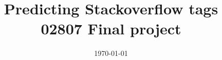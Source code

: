 \documentclass[a4paper]{article}
\numberwithin{equation}{section}
\begin{document}
\title{Predicting Stackoverflow tags \\ 02807 Final project}
\date{\today}

\maketitle









%

\pagebreak
\printbibliography
\end{document}
